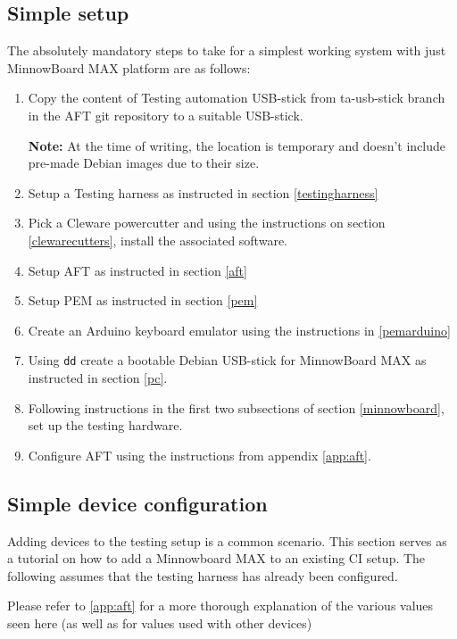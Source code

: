 \documentclass[a4paper,11pt]{article}
\newcommand{\note}{\textbf{Note: }}
\newcommand{\cmd}[1]{\texttt{#1}}
\begin{document}
\subsection{Simple setup}
The absolutely mandatory steps to take for a simplest working system with just MinnowBoard MAX platform are as follows:
\begin{enumerate}
	\item Copy the content of Testing automation USB-stick from ta-usb-stick branch in the AFT git repository to a suitable USB-stick.

\note{At the time of writing, the location is temporary and doesn't include pre-made Debian images due to their size.}
	\item Setup a Testing harness as instructed in section \ref{testingharness}
	\item Pick a Cleware powercutter and using the instructions on section \ref{clewarecutters}, install the associated software.
	\item Setup AFT as instructed in section \ref{aft}
	\item Setup PEM as instructed in section \ref{pem}
	\item Create an Arduino keyboard emulator using the instructions in \ref{pemarduino}
	\item Using \cmd{dd} create a bootable Debian USB-stick for MinnowBoard MAX as instructed in section \ref{pc}.
	\item Following instructions in the first two subsections of section \ref{minnowboard}, set up the testing hardware.
	\item Configure AFT using the instructions from appendix \ref{app:aft}.
\end{enumerate}

\subsection{Simple device configuration}

Adding devices to the testing setup is a common scenario. This section serves as a tutorial on how to add a Minnowboard MAX to an existing CI setup. The following assumes that the testing harness has already been configured.

Please refer to \ref{app:aft} for a more thorough explanation of the various values seen here (as well as for values used with other devices)
\end{document}
